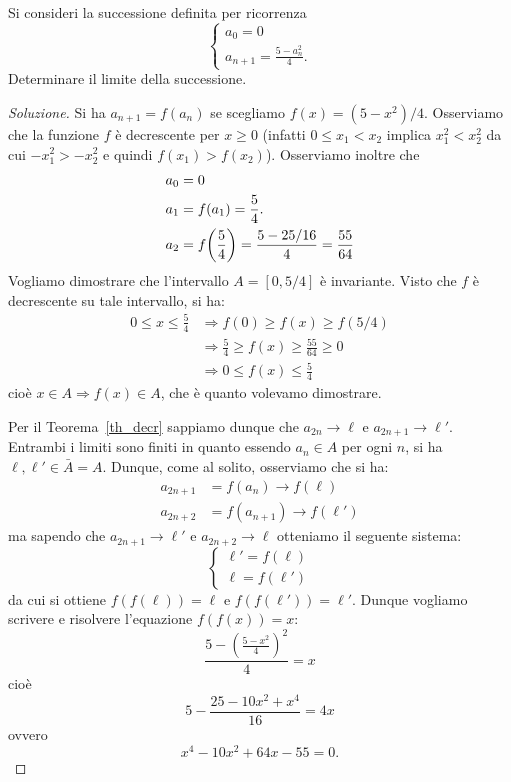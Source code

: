 \begin{exercise}\label{ex_6}
  Si consideri la successione definita per ricorrenza
  \[
  \begin{cases}
    a_0 = 0\\
    a_{n+1} = \frac{5-a_n^2}{4}.
  \end{cases}
  \]
  Determinare il limite della successione.
\end{exercise}

\begin{proof}[Soluzione]
Si ha $a_{n+1} = f(a_n)$ se scegliamo $f(x) = (5-x^2)/4$. Osserviamo
che la funzione $f$ è decrescente per $x \ge 0$ (infatti $0 \le x_1 <
x_2$ implica $x_1^2 < x_2^2$ da cui $-x_1^2 > -x_2^2$ e quindi $f(x_1)
> f(x_2)$). Osserviamo inoltre che
\begin{align*}
a_0 &= 0\\
a_1 &= f(a_1) = \frac 5 4.\\
a_2 &= f{\left( \frac 5 4 \right)} = \frac{5-25/16}{4} = \frac{55}{64}
\end{align*}
Vogliamo dimostrare che l'intervallo $A=[0,5/4]$ è invariante. Visto
che $f$ è decrescente su tale intervallo, si ha:
\begin{align*}
0 \le x \le \frac 5 4 &\Rightarrow f(0) \ge f(x) \ge f(5/4)\\
&\Rightarrow \frac 5 4 \ge f(x) \ge \frac{55}{64} \ge 0\\
&\Rightarrow 0 \le f(x) \le \frac 5 4
\end{align*}
cioè $x\in A \Rightarrow f(x)\in A$, che è quanto volevamo dimostrare.

Per il Teorema~\ref{th_decr} sappiamo dunque che $a_{2n} \to \ell$ e
$a_{2n+1} \to \ell'$. Entrambi i limiti sono finiti in quanto essendo
$a_n \in A$ per ogni $n$, si ha $\ell, \ell' \in \bar A = A$.
Dunque, come al solito, osserviamo che si ha:
\begin{align*}
  a_{2n+1} &= f(a_n) \to f(\ell)  \\
  a_{2n+2} &= f(a_{n+1}) \to f(\ell')
\end{align*}
ma sapendo che $a_{2n+1}\to \ell'$ e $a_{2n+2}\to \ell$ otteniamo il
seguente sistema:
\[
\begin{cases}
  \ell' = f(\ell)\\
  \ell = f(\ell')
\end{cases}
\]
da cui si ottiene $f(f(\ell))=\ell$ e $f(f(\ell'))=\ell'$. Dunque
vogliamo scrivere e risolvere l'equazione $f(f(x))=x$:
\[
\frac{5-\left(\frac{5-x^2}{4}\right)^2}{4} = x
\]
cioè
\[
5 - \frac{25 - 10x^2 + x^4}{16} = 4x
\]
ovvero
\[
x^4 - 10 x^2 + 64 x - 55 = 0.
\]


\end{proof}
